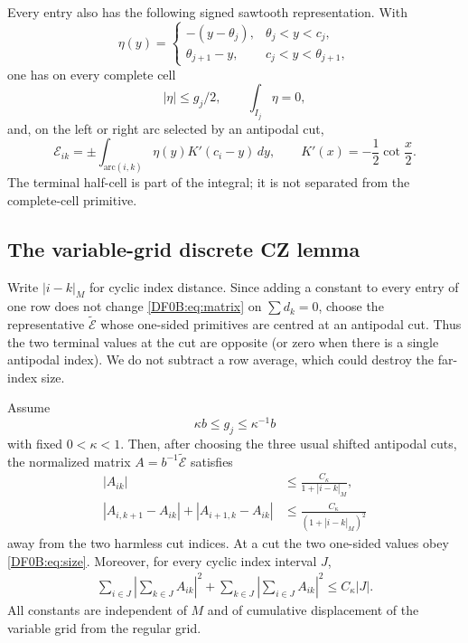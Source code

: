 Every entry also has the following signed sawtooth representation.  With
\begin{equation}\label{DF0B:eq:eta}
 \eta(y)=\begin{cases}
 -(y-\theta_j),&\theta_j<y<c_j,\\
 \theta_{j+1}-y,&c_j<y<\theta_{j+1},
 \end{cases}
\end{equation}
one has on every complete cell
\begin{equation}\label{DF0B:eq:eta-properties}
 |\eta|\le g_j/2,\qquad \int_{I_j}\eta=0,
\end{equation}
and, on the left or right arc selected by an antipodal cut,
\begin{equation}\label{DF0B:eq:saw}
 \mathcal E_{ik}=\pm\int_{\mathrm{arc}(i,k)}
 \eta(y)K'(c_i-y)\,dy,
 \qquad K'(x)=-\frac12\cot\frac x2.
\end{equation}
The terminal half-cell is part of the integral; it is not separated from
the complete-cell primitive.

\subsection{The variable-grid discrete CZ lemma}

Write $|i-k|_M$ for cyclic index distance.  Since adding a constant to
every entry of one row does not change \eqref{DF0B:eq:matrix} on
$\sum d_k=0$, choose the representative
$\widetilde{\mathcal E}$ whose one-sided primitives are centred at an
antipodal cut.  Thus the two terminal values at the cut are opposite (or
zero when there is a single antipodal index).  We do not subtract a row
average, which could destroy the far-index size.

\begin{lemma}
\label{DF0B:lem:kernel}
Assume
\begin{equation}\label{DF0B:eq:current-comparable}
 \kappa b\le g_j\le\kappa^{-1}b
\end{equation}
with fixed $0<\kappa<1$.  Then, after choosing the three usual shifted
antipodal cuts, the normalized matrix
$A=b^{-1}\widetilde{\mathcal E}$ satisfies
\begin{align}
 |A_{ik}|&\le\frac{C_\kappa}{1+|i-k|_M},\label{DF0B:eq:size}\\
 |A_{i,k+1}-A_{ik}|+|A_{i+1,k}-A_{ik}|
 &\le\frac{C_\kappa}{(1+|i-k|_M)^2}
 \label{DF0B:eq:smooth}
\end{align}
away from the two harmless cut indices.  At a cut the two one-sided
values obey \eqref{DF0B:eq:size}.  Moreover, for every cyclic index interval
$J$,
\begin{multline}\label{DF0B:eq:testing}
 \sum_{i\in J}\left|\sum_{k\in J}A_{ik}\right|^2
 +\sum_{k\in J}\left|\sum_{i\in J}A_{ik}\right|^2
 \le C_\kappa|J|.
\end{multline}
All constants are independent of $M$ and of cumulative displacement of
the variable grid from the regular grid.
\end{lemma}

